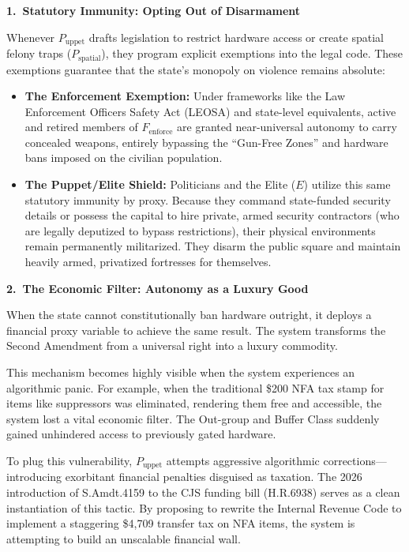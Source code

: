 \medskip
\noindent\textbf{1.\ Statutory Immunity: Opting Out of Disarmament}

\noindent Whenever $P_{\text{uppet}}$ drafts legislation to restrict hardware access or create spatial felony traps ($P_{\text{spatial}}$), they program explicit exemptions into the legal code. These exemptions guarantee that the state's monopoly on violence remains absolute:

\begin{itemize}
    \item \textbf{The Enforcement Exemption:} Under frameworks like the Law Enforcement Officers Safety Act (LEOSA) and state-level equivalents, active and retired members of $F_{\text{enforce}}$ are granted near-universal autonomy to carry concealed weapons, entirely bypassing the ``Gun-Free Zones'' and hardware bans imposed on the civilian population.

    \item \textbf{The Puppet/Elite Shield:} Politicians and the Elite ($E$) utilize this same statutory immunity by proxy. Because they command state-funded security details or possess the capital to hire private, armed security contractors (who are legally deputized to bypass restrictions), their physical environments remain permanently militarized. They disarm the public square and maintain heavily armed, privatized fortresses for themselves.
\end{itemize}

\medskip
\noindent\textbf{2.\ The Economic Filter: Autonomy as a Luxury Good}

\noindent When the state cannot constitutionally ban hardware outright, it deploys a financial proxy variable to achieve the same result. The system transforms the Second Amendment from a universal right into a luxury commodity.

This mechanism becomes highly visible when the system experiences an algorithmic panic. For example, when the traditional \$200 NFA tax stamp for items like suppressors was eliminated, rendering them free and accessible, the system lost a vital economic filter. The Out-group and Buffer Class suddenly gained unhindered access to previously gated hardware.

To plug this vulnerability, $P_{\text{uppet}}$ attempts aggressive algorithmic corrections---introducing exorbitant financial penalties disguised as taxation. The 2026 introduction of S.Amdt.4159 to the CJS funding bill (H.R.6938) serves as a clean instantiation of this tactic. By proposing to rewrite the Internal Revenue Code to implement a staggering \$4,709 transfer tax on NFA items, the system is attempting to build an unscalable financial wall.

